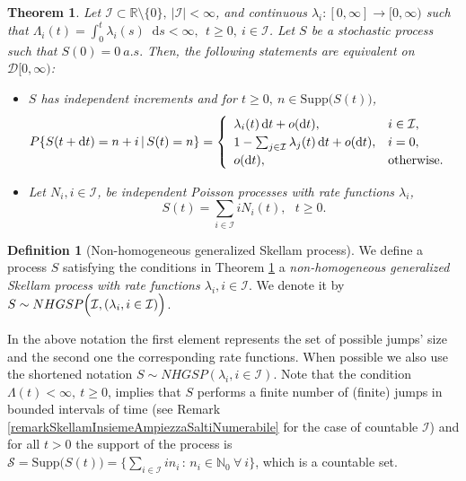 \documentclass[12pt, twoside, english, headsepline]{article}
\newcommand*\dif{\mathop{}\!\mathrm{d}}  %
\newtheorem{theorem}{Theorem}[section] %
\theoremstyle{definition} %
\newtheorem{definition}{Definition}[section]
\numberwithin{equation}{section} %
\begin{document}
\begin{theorem}\label{teoremaDefinzioniEquivalentiSkellamGeneralizzato}
Let $\mathcal{I}\subset \mathbb{R}\setminus\{0\}, \ |\mathcal{I}|<\infty$, and continuous $\lambda_i : [0,\infty] \longrightarrow [0, \infty)$ such that $\Lambda_i(t) = \int_0^t \lambda_i(s)\dif s<\infty,\ \ t\ge0,\ i\in \mathcal{I}$. Let $S$ be a stochastic process such that $S(0) = 0\ a.s.$ Then, the following statements are equivalent on $\mathcal{D}[0,\infty)$:
\begin{itemize}
\item[($i$)] $S$ has independent increments and for $t\ge0,\ n\in \text{Supp}\bigl(S(t)\bigr)$,
\begin{equation}\label{definizioneInfinitesimaleSkellamGeneralizzatoNonOmogeneo}
P\{S(t+\dif t) = n+i\,|\,S(t) = n\} = 
\begin{cases}
\begin{array}{l l}
\lambda_i(t)\dif t + o(\dif t), & i\in \mathcal{I},\\
1-\sum_{j\in\mathcal{I}} \lambda_j(t) \dif t + o(\dif t), & i=0, \\
o(\dif t), & \text{otherwise}.
\end{array}
\end{cases}
\end{equation}
\item[($ii$)] Let $N_i, i\in\mathcal{I}$, be independent Poisson processes with rate functions $\lambda_i$,
\begin{equation}\label{SkellamGeneralizzatoInTerminiDiPoisson}
S(t)=\sum_{i\in\mathcal{I}} i N_i(t),\ \ \ t\ge0.
\end{equation}
\end{itemize}
\end{theorem}

\begin{definition}[Non-homogeneous generalized Skellam process]
We define a process $S$ satisfying the conditions in Theorem \ref{teoremaDefinzioniEquivalentiSkellamGeneralizzato} a \textit{non-homogeneous generalized Skellam process with rate functions $\lambda_i, i\in \mathcal{I}$}. We denote it by $S\sim NHGSP\Bigl(\mathcal{I}, (\lambda_i, i\in \mathcal{I} )\Bigr)$.
\end{definition}
In the above notation the first element represents the set of possible jumps' size and the second one the corresponding rate functions. When possible we also use the shortened notation $S\sim NHGSP(\lambda_i, i\in \mathcal{I} )$. Note that the condition $\Lambda(t)<\infty, \ t\ge0$, implies that $S$ performs a finite number of (finite) jumps in bounded intervals of time (see Remark \ref{remarkSkellamInsiemeAmpiezzaSaltiNumerabile} for the case of countable $\mathcal{I}$) and for all $t>0$ the support of the process is $\mathcal{S} = \text{Supp}\bigl(S(t)\bigr) = \big\{ \sum_{i\in \mathcal{I}} i n_i\,:\, n_i \in\mathbb{N}_0\ \forall\ i\big\}$, which is a countable set.
\end{document}

